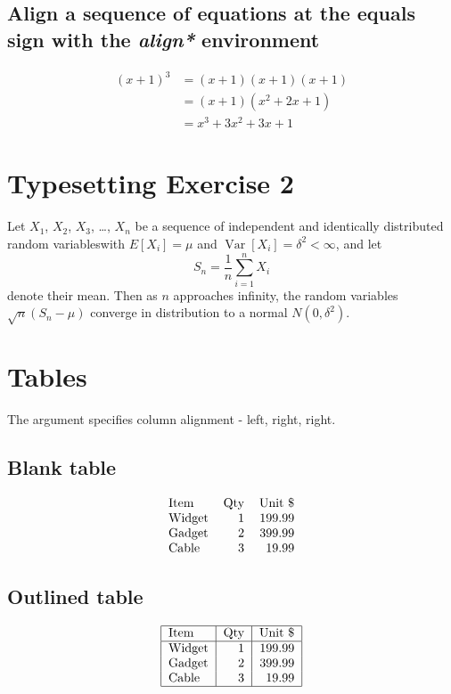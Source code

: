 \documentclass[12pt]{article}
\begin{document}
\subsection{Align a sequence of equations at the equals sign with the \emph{align*} environment}

\begin{align*}
    (x+1)^3 &= (x+1)(x+1)(x+1)      \\
            &= (x+1)(x^2 + 2x + 1)  \\
            &= x^3 + 3x^2 + 3x + 1
\end{align*}

\section{Typesetting Exercise 2}

Let $X_1$, $X_2$, $X_3$, \ldots, $X_n$ be a sequence of independent and identically distributed random variableswith $E[X_i] = \mu$ and $\operatorname{Var}[X_i] = \delta^2 < \infty$, and let
\begin{equation}
    S_n = \frac{1}{n}\sum_{i=1}^{n}X_i
\end{equation}
denote their mean. Then as $n$ approaches infinity, the random variables $\sqrt{n}(S_n - \mu)$ converge in distribution to a normal $N(0,\delta^2)$.

\section{Tables}

The argument specifies column alignment - left, right, right.

\subsection{Blank table}

\begin{align}
    \begin{tabular}{lrr}
        Item    & Qty   & Unit \$   \\
        Widget  & 1     & 199.99    \\
        Gadget  & 2     & 399.99    \\
        Cable   & 3     & 19.99     \\
    \end{tabular}
\end{align}

\subsection{Outlined table}

\begin{align}
    \begin{tabular}{|l|r|r|} 
        \hline
        Item    & Qty   & Unit \$   \\
        \hline
        Widget  & 1     & 199.99    \\
        Gadget  & 2     & 399.99    \\
        Cable   & 3     & 19.99     \\
        \hline
    \end{tabular}
\end{align}
\end{document}
